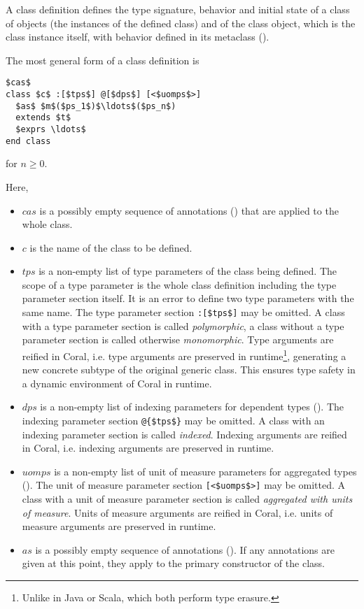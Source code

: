 A class definition defines the type signature, behavior and initial state of a class of objects (the instances of the defined class) and of the class object, which is the class instance itself, with behavior defined in its metaclass (). 

The most general form of a class definition is
\begin{lstlisting}
$cas$
class $c$ :[$tps$] @[$dps$] [<$uomps$>] 
  $as$ $m$($ps_1$)$\ldots$($ps_n$)
  extends $t$
  $exprs \ldots$
end class
\end{lstlisting}
for $n \geq 0$. 

Here, 
\begin{itemize}
\item[]
$cas$ is a possibly empty sequence of annotations () that are applied to the whole class. 

\item[]
$c$ is the name of the class to be defined. 

\item[]
$tps$ is a non-empty list of type parameters of the class being defined. The scope of a type parameter is the whole class definition including the type parameter section itself. It is an error to define two type parameters with the same name. The type parameter section \lstinline!:[$tps$]! may be omitted. A class with a type parameter section is called {\em polymorphic}, a class without a type parameter section is called otherwise {\em monomorphic}. Type arguments are reified in Coral, i.e. type arguments are preserved in runtime\footnote{Unlike in Java or Scala, which both perform type erasure.}, generating a new concrete subtype of the original generic class. This ensures type safety in a dynamic environment of Coral in runtime. 

\item[]
$dps$ is a non-empty list of indexing parameters for dependent types (). The indexing parameter section \lstinline!@{$tps$}! may be omitted. A class with an indexing parameter section is called {\em indexed}. Indexing arguments are reified in Coral, i.e. indexing arguments are preserved in runtime. 

\item[]
$uomps$ is a non-empty list of unit of measure parameters for aggregated types (). The unit of measure parameter section \lstinline![<$uomps$>]! may be omitted. A class with a unit of measure parameter section is called {\em aggregated with units of measure}. Units of measure arguments are reified in Coral, i.e. units of measure arguments are preserved in runtime. 

\item[]
$as$ is a possibly empty sequence of annotations (). If any annotations are given at this point, they apply to the primary constructor of the class. 

\end{itemize}

